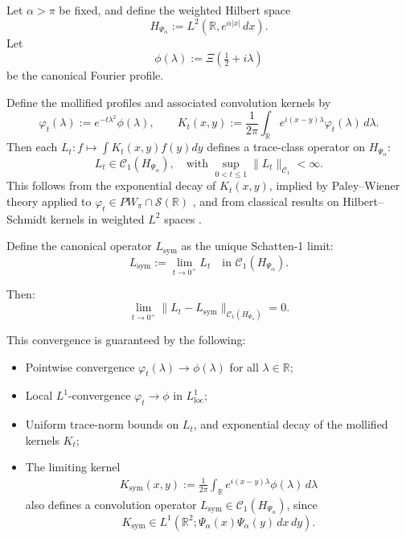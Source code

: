 \begin{lemma}
\label{lem:trace_norm_convergence_Lt_to_Lsym}
Let \( \alpha > \pi \) be fixed, and define the weighted Hilbert space
\[
H_{\Psi_\alpha} := L^2(\mathbb{R}, e^{\alpha|x|}\, dx).
\]
Let
\[
\phi(\lambda) := \Xi\left( \tfrac{1}{2} + i\lambda \right)
\]
be the canonical Fourier profile.

Define the mollified profiles and associated convolution kernels by
\[
\varphi_t(\lambda) := e^{-t\lambda^2} \phi(\lambda), \qquad
K_t(x,y) := \frac{1}{2\pi} \int_{\mathbb{R}} e^{i(x - y)\lambda} \varphi_t(\lambda)\, d\lambda.
\]
Then each \( L_t \colon f \mapsto \int K_t(x,y) f(y) dy \) defines a trace-class operator on \( H_{\Psi_\alpha} \):
\[
L_t \in \mathcal{C}_1(H_{\Psi_\alpha}), \quad \text{with } \sup_{0 < t \le 1} \|L_t\|_{\mathcal{C}_1} < \infty.
\]
This follows from the exponential decay of \( K_t(x,y) \), implied by Paley--Wiener theory applied to \( \varphi_t \in PW_\pi \cap \mathcal{S}(\mathbb{R}) \) \cite[Thm.~IX.12]{ReedSimon1975II}, and from classical results on Hilbert--Schmidt kernels in weighted \( L^2 \) spaces \cite[Ch.~4]{Simon2005TraceIdeals}.

\medskip

Define the canonical operator \( L_{\mathrm{sym}} \) as the unique Schatten-1 limit:
\[
L_{\mathrm{sym}} := \lim_{t \to 0^+} L_t \quad \text{in } \mathcal{C}_1(H_{\Psi_\alpha}).
\]

Then:
\[
\lim_{t \to 0^+} \| L_t - L_{\mathrm{sym}} \|_{\mathcal{C}_1(H_{\Psi_\alpha})} = 0.
\]

\medskip

\noindent
This convergence is guaranteed by the following:
\begin{itemize}
  \item Pointwise convergence \( \varphi_t(\lambda) \to \phi(\lambda) \) for all \( \lambda \in \mathbb{R} \);
  \item Local \( L^1 \)-convergence \( \varphi_t \to \phi \) in \( L^1_{\mathrm{loc}} \);
  \item Uniform trace-norm bounds on \( L_t \), and exponential decay of the mollified kernels \( K_t \);
  \item The limiting kernel
  \begin{multline*}
  K_{\mathrm{sym}}(x,y) := \frac{1}{2\pi} \int_{\mathbb{R}} 
  e^{i(x-y)\lambda} \phi(\lambda)\, d\lambda
  \end{multline*}
  also defines a convolution operator \( L_{\mathrm{sym}} \in \mathcal{C}_1(H_{\Psi_\alpha}) \), since
  \[
  K_{\mathrm{sym}} \in L^1(\mathbb{R}^2; \Psi_\alpha(x)\Psi_\alpha(y)\,dx\,dy).
  \]
\end{itemize}


\end{lemma}
